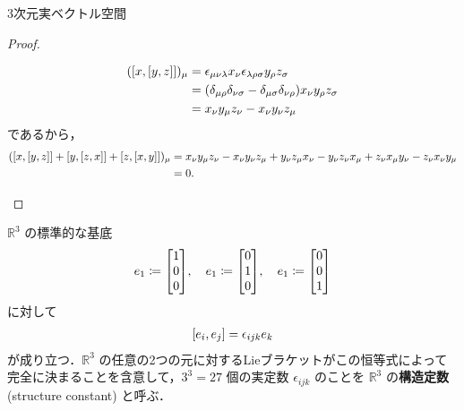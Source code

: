 \documentclass[rep_main]{subfiles}
\begin{document}
\begin{myexample}[label=ex:R3-LieAlg]{3次元実ベクトル空間}
\begin{proof}
\begin{description}
\begin{align}
                (\comm{x}{\comm{y}{z}})_\mu &= \epsilon_{\mu\nu\lambda} x_\nu \epsilon_{\lambda\rho\sigma} y_\rho z_\sigma \\
                &= (\delta_{\mu\rho}\delta_{\nu \sigma} - \delta_{\mu\sigma} \delta_{\nu\rho}) x_\nu y_\rho z_\sigma \\
                &= x_\nu y_\mu z_\nu - x_\nu y_\nu z_\mu
            \end{align}
            であるから，
            \begin{align}
                (\comm{x}{\comm{y}{z}} + \comm{y}{\comm{z}{x}} + \comm{z}{\comm{x}{y}})_\mu 
                &= x_\nu y_\mu z_\nu - x_\nu y_\nu z_\mu + y_\nu z_\mu x_\nu - y_\nu z_\nu x_\mu + z_\nu x_\mu y_\nu - z_\nu x_\nu y_\mu \\
                &= 0.
            \end{align}
        \end{description}
    \end{proof}
    $\mathbb{R}^3$ の標準的な基底
    \begin{align}
        e_1 \coloneqq \mqty[1 \\ 0 \\ 0],\quad e_1 \coloneqq \mqty[0 \\ 1 \\ 0],\quad e_1 \coloneqq \mqty[0 \\ 0 \\ 1]
    \end{align}
    に対して
    \begin{align}
        \comm{e_i}{e_j} = \epsilon_{ijk} e_k
    \end{align}
    が成り立つ．$\mathbb{R}^3$ の任意の2つの元に対するLieブラケットがこの恒等式によって完全に決まることを含意して，$3^3 = 27$ 個の実定数 $\epsilon_{ijk}$ のことを $\mathbb{R}^3$ の\textbf{構造定数} (structure constant) と呼ぶ．
\end{myexample}
\end{document}
